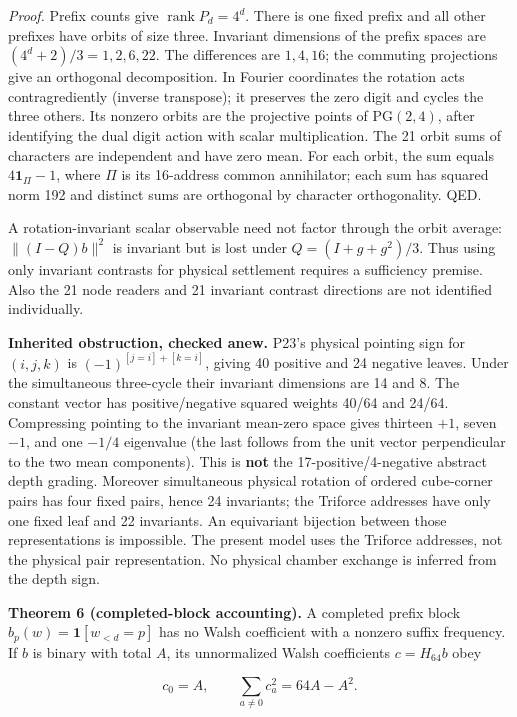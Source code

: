 \documentclass[
  11pt,
]{article}
\begin{document}
\emph{Proof.} Prefix counts give \(\operatorname{rank}P_d=4^d\). There
is one fixed prefix and all other prefixes have orbits of size three.
Invariant dimensions of the prefix spaces are \((4^d+2)/3=1,2,6,22\).
The differences are \(1,4,16\); the commuting projections give an
orthogonal decomposition. In Fourier coordinates the rotation acts
contragrediently (inverse transpose); it preserves the zero digit and
cycles the three others. Its nonzero orbits are the projective points of
\(\mathrm{PG}(2,4)\), after identifying the dual digit action with
scalar multiplication. The 21 orbit sums of characters are independent
and have zero mean. For each orbit, the sum equals
\(4\mathbf1_{\Pi}-1\), where \(\Pi\) is its 16-address common
annihilator; each sum has squared norm 192 and distinct sums are
orthogonal by character orthogonality. QED.

A rotation-invariant scalar observable need not factor through the orbit
average: \(\|(I-Q)b\|^2\) is invariant but is lost under
\(Q=(I+g+g^2)/3\). Thus using only invariant contrasts for physical
settlement requires a sufficiency premise. Also the 21 node readers and
21 invariant contrast directions are not identified individually.

\textbf{Inherited obstruction, checked anew.} P23's physical pointing
sign for \((i,j,k)\) is \((-1)^{[j=i]+[k=i]}\), giving 40 positive and
24 negative leaves. Under the simultaneous three-cycle their invariant
dimensions are 14 and 8. The constant vector has positive/negative
squared weights 40/64 and 24/64. Compressing pointing to the invariant
mean-zero space gives thirteen \(+1\), seven \(-1\), and one \(-1/4\)
eigenvalue (the last follows from the unit vector perpendicular to the
two mean components). This is \textbf{not} the 17-positive/4-negative
abstract depth grading. Moreover simultaneous physical rotation of
ordered cube-corner pairs has four fixed pairs, hence 24 invariants; the
Triforce addresses have only one fixed leaf and 22 invariants. An
equivariant bijection between those representations is impossible. The
present model uses the Triforce addresses, not the physical pair
representation. No physical chamber exchange is inferred from the depth
sign.

\textbf{Theorem 6 (completed-block accounting).} A completed prefix
block \(b_p(w)=\mathbf1[w_{<d}=p]\) has no Walsh coefficient with a
nonzero suffix frequency. If \(b\) is binary with total \(A\), its
unnormalized Walsh coefficients \(c=H_{64}b\) obey

\[c_0=A,\qquad \sum_{a\ne0}c_a^2=64A-A^2.\]
\end{document}
